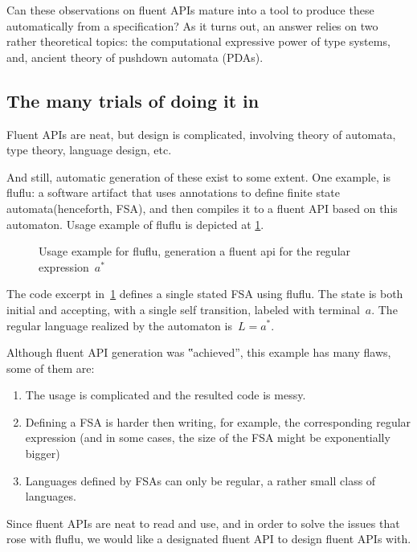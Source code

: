 Can these observations on fluent APIs mature into
  a tool to produce these automatically from a specification?
As it turns out, an answer relies on
  two rather theoretical topics:
  the computational expressive power of type systems,
  and, ancient theory of pushdown automata (PDAs).

\subsection{The many trials of doing it in \Java}
Fluent APIs are neat, but design is complicated,
involving theory of automata, type theory, language design, etc.

And still, automatic generation of these exist to some extent.
One example, is fluflu: a software artifact that uses
\Java annotations to define finite state automata(henceforth, FSA), and then
compiles it to a fluent API based on this automaton. Usage example of fluflu is
depicted at \cref{figure:fluflu}.

\begin{figure}[ht]
  \caption{\label{figure:fluflu}
    Usage example for fluflu, generation a fluent
    api for the regular expression~$a^*$}
\end{figure}
The code excerpt in~\cref{figure:fluflu} defines a single stated FSA using
fluflu. The state is both initial and accepting, with a single self
transition, labeled with terminal~$a$. The regular language realized by the
automaton is~$L=a^*$.

Although fluent API generation was ‟achieved”, this example has many flaws, some of them are:

\begin{enumerate}
  \item The usage is complicated and the resulted code is messy.
  \item Defining a FSA is harder then writing, for example, the corresponding regular
    expression (and in some cases, the size of the FSA might be exponentially bigger)
  \item Languages defined by FSAs can only be regular, a rather small
    class of languages.
\end{enumerate}

Since fluent APIs are neat to read and use,
  and in order to solve the issues that rose with fluflu,
  we would like a designated fluent API to design fluent APIs with.

